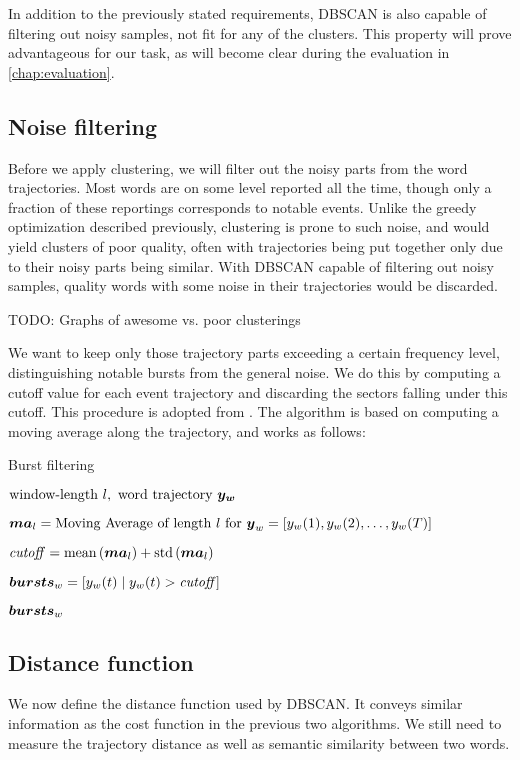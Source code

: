 In addition to the previously stated requirements, DBSCAN is also capable of filtering out noisy samples, not fit for any of the clusters. This property will prove advantageous for our task, as will become clear during the evaluation in \autoref{chap:evaluation}.


\subsection{Noise filtering}
Before we apply clustering, we will filter out the noisy parts from the word trajectories. Most words are on some level reported all the time, though only a fraction of these reportings corresponds to notable events. Unlike the greedy optimization described previously, clustering is prone to such noise, and would yield clusters of poor quality, often with trajectories being put together only due to their noisy parts being similar. With DBSCAN capable of filtering out noisy samples, quality words with some noise in their trajectories would be discarded.

{\color{red} TODO: Graphs of awesome vs. poor clusterings}

We want to keep only those trajectory parts exceeding a certain frequency level, distinguishing notable bursts from the general noise. We do this by computing a cutoff value for each event trajectory and discarding the sectors falling under this cutoff. This procedure is adopted from \cite{online-search-queries}. The algorithm is based on computing a moving average along the trajectory, and works as follows:

\begin{algorithm}[H]
\begin{algorithmic}[1]
\caption{Burst filtering}
\Input $\text{window-length} \ l,\ \text{word trajectory} \ \vect{\traj_{w}}$

\State $\vect{MA}_{l} = \text{Moving Average of length} ~ l ~ \text{for} ~ \vect{\traj}_{w} = \left[ \traj_{w}(1), \traj_{w}(2), \dots, \traj_{w}(\streamlen) \right]$

\State $\mathit{cutoff} = \text{mean} \left( \vect{MA}_{l} \right) + \text{std} \left( \vect{MA}_{l} \right)$

\State $\vect{bursts}_{w} = \left[ \traj_{w}(t) \mid \traj_{w	}(t) > \mathit{cutoff} \right]$

\Output $\vect{bursts}_{w}$
\end{algorithmic}
\end{algorithm}


\subsection{Distance function}
We now define the distance function used by DBSCAN. It conveys similar information as the cost function in the previous two algorithms. We still need to measure the trajectory distance as well as semantic similarity between two words.

